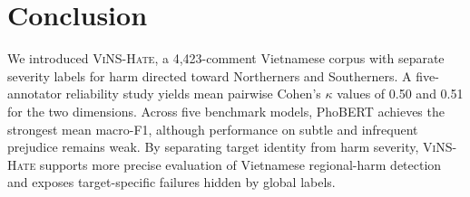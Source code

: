 \documentclass[11pt]{article}
\newcommand{\dataset}{\textsc{ViNS-Hate}}
\begin{document}
\section{Conclusion}

We introduced \dataset, a 4,423-comment Vietnamese corpus with separate severity labels for harm directed toward Northerners and Southerners. A five-annotator reliability study yields mean pairwise Cohen's $\kappa$ values of 0.50 and 0.51 for the two dimensions. Across five benchmark models, PhoBERT achieves the strongest mean macro-F1, although performance on subtle and infrequent prejudice remains weak. By separating target identity from harm severity, \dataset{} supports more precise evaluation of Vietnamese regional-harm detection and exposes target-specific failures hidden by global labels.
\end{document}
